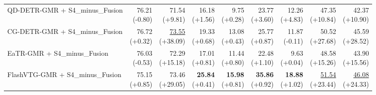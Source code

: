 \documentclass{article}
\begin{document}
\begin{table}[ht]
{\begin{tabular}{lrrrrrrrr}
QD-DETR-GMR + S4\_minus\_Fusion & \shortstack{76.21 \\ {\scriptsize (-0.80)}} & \shortstack{71.54 \\ {\scriptsize (+9.81)}} & \shortstack{16.18 \\ {\scriptsize (+1.56)}} & \shortstack{9.75 \\ {\scriptsize (+0.28)}} & \shortstack{23.77 \\ {\scriptsize (+3.60)}} & \shortstack{12.26 \\ {\scriptsize (+4.83)}} & \shortstack{47.35 \\ {\scriptsize (+10.84)}} & \shortstack{42.37 \\ {\scriptsize (+10.90)}} \\
CG-DETR-GMR + S4\_minus\_Fusion & \shortstack{76.72 \\ {\scriptsize (+0.32)}} & \shortstack{\underline{73.55} \\ {\scriptsize (+38.09)}} & \shortstack{19.33 \\ {\scriptsize (+0.68)}} & \shortstack{13.08 \\ {\scriptsize (+0.43)}} & \shortstack{25.77 \\ {\scriptsize (+0.87)}} & \shortstack{11.87 \\ {\scriptsize (-0.11)}} & \shortstack{50.52 \\ {\scriptsize (+27.68)}} & \shortstack{45.59 \\ {\scriptsize (+28.52)}} \\
EaTR-GMR + S4\_minus\_Fusion & \shortstack{76.03 \\ {\scriptsize (-0.53)}} & \shortstack{72.29 \\ {\scriptsize (+15.18)}} & \shortstack{17.01 \\ {\scriptsize (+0.81)}} & \shortstack{11.44 \\ {\scriptsize (+0.80)}} & \shortstack{22.48 \\ {\scriptsize (+1.10)}} & \shortstack{9.63 \\ {\scriptsize (+0.04)}} & \shortstack{48.58 \\ {\scriptsize (+15.26)}} & \shortstack{43.90 \\ {\scriptsize (+15.56)}} \\
FlashVTG-GMR + S4\_minus\_Fusion & \shortstack{75.15 \\ {\scriptsize (+0.85)}} & \shortstack{73.46 \\ {\scriptsize (+29.05)}} & \shortstack{\textbf{25.84} \\ {\scriptsize (+0.41)}} & \shortstack{\textbf{15.98} \\ {\scriptsize (+0.81)}} & \shortstack{\textbf{35.86} \\ {\scriptsize (+0.92)}} & \shortstack{\textbf{18.88} \\ {\scriptsize (+1.02)}} & \shortstack{\underline{51.54} \\ {\scriptsize (+23.44)}} & \shortstack{\underline{46.08} \\ {\scriptsize (+24.33)}} \\

\end{tabular}}
\end{table}
\end{document}
